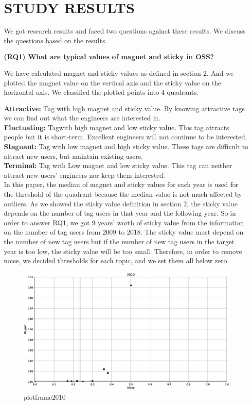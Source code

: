 \documentclass[conference]{IEEEtran}
\begin{document}
\section{STUDY RESULTS} %
We got research results and faced two questions against these results. We discuss the questions based on the results.

\textbf{(RQ1) What are typical values of magnet and sticky in OSS?}

We have calculated magnet and sticky values as defined in section 2. And we plotted the magnet value on the vertical axis and the sticky value on the horizontal axis. We classified the plotted points into 4 quadrants.

\smallskip
\textbf{Attractive:} Tag with high magnet and sticky value. By knowing attractive tags we can find out what the engineers are interested in.\\
\textbf{Fluctuating:} Tagwith high magnet and low sticky value. This tag attracts people but it is short-term. Excellent engineers will not continue to be interested.\\
\textbf{Stagnant:} Tag with low magnet and high sticky value. These tags are difficult to attract new users, but maintain existing users.\\
\textbf{Terminal:} Tag with Low magnet and low sticky value. This tag can neither attract new users' engineers nor keep them interested.\\
\smallskip
In this paper, the median of magnet and sticky values for each year is used for the threshold of the quadrant because the median value is not much affected by outliers. As we showed the sticky value definition in section 2, the sticky value depends on the number of tag users in that year and the following year. So in order to answer RQ1, we got 9 years' worth of sticky value from the information on the number of tag users from 2009 to 2018. The sticky value must depend on the number of new tag users but if the number of new tag users in the target year is too low, the sticky value will be too small. Therefore, in order to remove noise, we decided thresholds for each topic, and we set them all below zero. 
\medskip

\begin{figure}[t]
 \centering
 \includegraphics[width=.9\hsize]{img/plot_frame_2010.eps}  
 \caption{plotframe2010} 
 \label{fig:plotframe2010} 
\end{figure}
\end{document}
